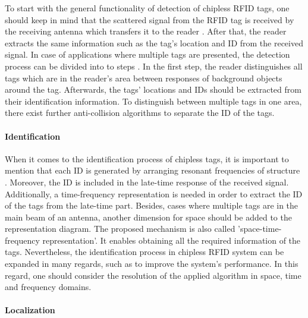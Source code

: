 To start with the general functionality of detection of chipless RFID tags, one should keep in mind that the scattered signal from the RFID tag is received by the receiving antenna which transfers it to the reader \cite[p.127 ff.]{chipless}. After that, the reader extracts the same information such as the tag's location and ID from the received signal. In case of applications where multiple tags are presented, the detection process can be divided into to steps \cite[p.127 ff.]{chipless}. In the first step, the reader distinguishes all tags which are in the reader's area between responses of background objects around the tag. Afterwards, the tags' locations and IDs should be extracted from their identification information. To distinguish between multiple tags in one area, there exist further anti-collision algorithms to separate the ID of the tags.

\paragraph{Identification}

When it comes to the identification process of chipless tags, it is important to mention that each ID is generated by arranging resonant frequencies of structure \cite[p.129]{chipless}. Moreover, the ID is included in the late-time response of the received signal. Additionally, a time-frequency representation is needed in order to extract the ID of the tags from the late-time part. Besides, cases where multiple tags are in the main beam of an antenna, another dimension for space should be added to the representation diagram. The proposed mechanism is also called 'space-time-frequency representation'. It enables obtaining all the required information of the tags. Nevertheless, the identification process in chipless RFID system can be expanded in many regards, such as to improve the system's performance. In this regard, one should consider the resolution of the applied algorithm in space, time and frequency domains.   

\paragraph{Localization}

